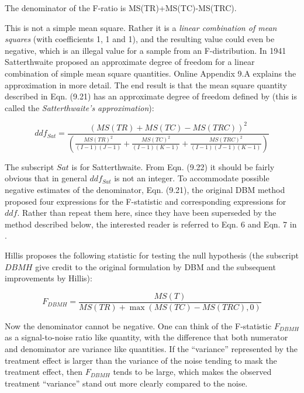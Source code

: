 \documentclass[
]{book}
\begin{document}
The denominator of the F-ratio is MS(TR)+MS(TC)-MS(TRC).

This is not a simple mean square. Rather it is a \emph{linear combination of mean squares} (with coefficients 1, 1 and 1), and the resulting value could even be negative, which is an illegal value for a sample from an F-distribution. In 1941 Satterthwaite \citep{RN2359, RN2360} proposed an approximate degree of freedom for a linear combination of simple mean square quantities. Online Appendix 9.A explains the approximation in more detail. The end result is that the mean square quantity described in Eqn. (9.21) has an approximate degree of freedom defined by (this is called the \emph{Satterthwaite's approximation}):

\begin{equation}
ddf_{Sat}=\frac{\left ( MS(TR) + MS(TC) - MS(TRC) \right )^2}{\left ( \frac{MS(TR)^2}{(I-1)(J-1)} + \frac{MS(TC)^2}{(I-1)(K-1)} + \frac{MS(TRC)^2}{(I-1)(J-1)(K-1)}  \right )}
\label{eq:ddfSatter}
\end{equation}

The subscript \(Sat\) is for Satterthwaite. From Eqn. (9.22) it should be fairly obvious that in general \(ddf_{Sat}\) is not an integer. To accommodate possible negative estimates of the denominator, Eqn. (9.21), the original DBM method \citep{RN204} proposed four expressions for the F-statistic and corresponding expressions for \(ddf\). Rather than repeat them here, since they have been superseded by the method described below, the interested reader is referred to Eqn. 6 and Eqn. 7 in \citep{RN1866}.

Hillis \citep{RN1865} proposes the following statistic for testing the null hypothesis (the subscript \(DBMH\) give credit to the original formulation by DBM and the subsequent improvements by Hillis):

\begin{equation}
F_{DBMH} = \frac{MS(T)}{MS(TR) + \max \left (MS(TC) - MS(TRC), 0  \right )}
\label{eq:FStatHillis}
\end{equation}

Now the denominator cannot be negative. One can think of the F-statistic \(F_{DBMH}\) as a signal-to-noise ratio like quantity, with the difference that both numerator and denominator are variance like quantities. If the ``variance'' represented by the treatment effect is larger than the variance of the noise tending to mask the treatment effect, then \(F_{DBMH}\) tends to be large, which makes the observed treatment ``variance'' stand out more clearly compared to the noise.
\end{document}
